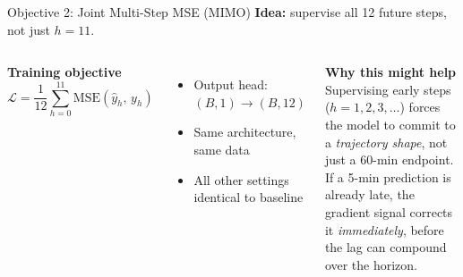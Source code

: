 \begin{frame}[t]{Objective 2: Joint Multi-Step MSE (MIMO)}
  \textbf{Idea:} supervise all 12 future steps, not just $h{=}11$.
  \vspace{8pt}
  \begin{columns}[T]
    \textbf{Training objective}
    \[ \mathcal{L} = \frac{1}{12}\sum_{h=0}^{11}\mathrm{MSE}(\hat{y}_h,\,y_h) \]
    \begin{itemize}
      \item Output head: $(B, 1) \to (B, 12)$
      \item Same architecture, same data
      \item All other settings identical to baseline
    \end{itemize}

    \textbf{Why this might help}\\[4pt]
    Supervising early steps ($h{=}1, 2, 3, \ldots$) forces the model to commit to a \emph{trajectory shape}, not just a 60-min endpoint. \\[4pt]
    If a 5-min prediction is already late, the gradient signal corrects it \emph{immediately}, before the lag can compound over the horizon.
  \end{columns}
\end{frame}

